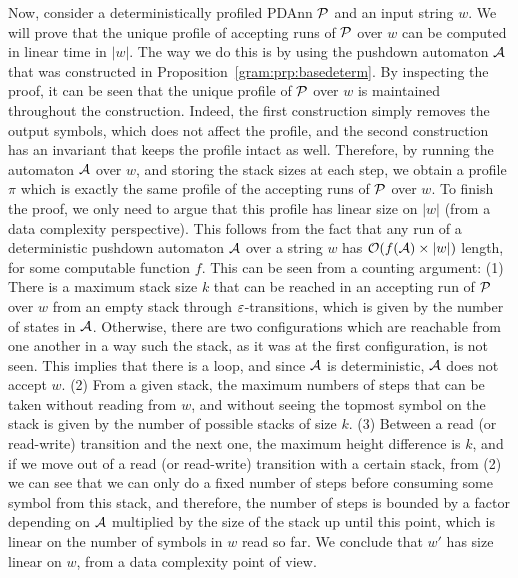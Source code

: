 Now, consider a deterministically profiled PDAnn $\mathcal{P}$ and an input string $w$. We will prove that the unique profile of accepting runs of $\mathcal{P}$ over $w$ can be computed in linear time in $|w|$. The way we do this is by using the pushdown automaton $\mathcal{A}$ that was constructed in Proposition~\ref{gram:prp:basedeterm}. By inspecting the proof, it can be seen that the unique profile of $\mathcal{P}$ over $w$ is maintained throughout the construction. Indeed, the first construction simply removes the output symbols, which does not affect the profile, and the second construction has an invariant that keeps the profile intact as well. Therefore, by running the automaton $\mathcal{A}$ over $w$, and storing the stack sizes at each step, we obtain a profile $\pi$ which is exactly the same profile of the accepting runs of $\mathcal{P}$ over $w$. To finish the proof, we only need to argue that this profile has linear size on $|w|$ (from a data complexity perspective). This follows from the fact that any run of a deterministic pushdown automaton $\mathcal{A}$ over a string $w$ has $\mathcal{O}(f(\mathcal{A})\times|w|)$ length, for some computable function $f$. This can be seen from a counting argument: (1) There is a maximum stack size $k$ that can be reached in an accepting run of $\mathcal{P}$ over $w$ from an empty stack through $\varepsilon$-transitions, which is given by the number of states in $\mathcal{A}$. Otherwise, there are two configurations which are reachable from one another in a way such the stack, as it was at the first configuration, is not seen. This implies that there is a loop, and since $\mathcal{A}$ is deterministic, $\mathcal{A}$ does not accept $w$. (2) From a given stack, the maximum numbers of steps that can be taken without reading from $w$, and without seeing the topmost symbol on the stack is given by the number of possible stacks of size $k$. (3) Between a read (or read-write) transition and the next one, the maximum height difference is $k$, and if we move out of a read (or read-write) transition with a certain stack, from (2) we can see that we can only do a fixed number of steps before consuming some symbol from this stack, and therefore, the number of steps is bounded by a factor depending on $\mathcal{A}$ multiplied by the size of the stack up until this point, which is linear on the number of symbols in $w$ read so far. We conclude that $w'$ has size linear on $w$, from a data complexity point of view.
